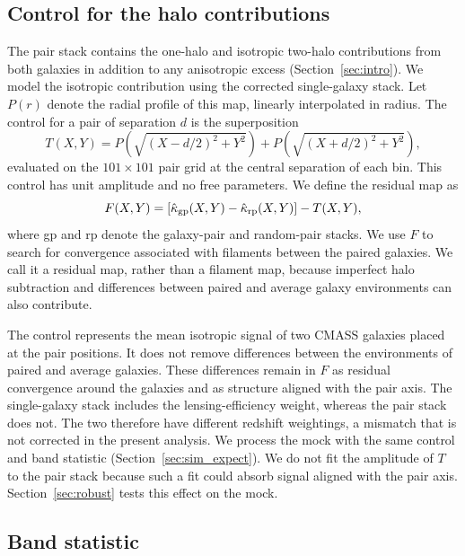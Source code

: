 \subsection{Control for the halo contributions}
\label{sec:control}

The pair stack contains the one-halo and isotropic two-halo contributions
from both galaxies in addition to any anisotropic excess
(Section~\ref{sec:intro}). We model the isotropic contribution using the
corrected single-galaxy stack. Let $P(r)$ denote the radial profile of this
map, linearly interpolated in radius. The control for a
pair of separation $d$ is the superposition
\begin{equation}
  T(X,Y) = P\!\left(\sqrt{(X-d/2)^{2}+Y^{2}}\right)
         + P\!\left(\sqrt{(X+d/2)^{2}+Y^{2}}\right),
  \label{eq:control}
\end{equation}
evaluated on the $101\times101$ pair grid at the central separation of each
bin. This control has unit amplitude and no free parameters. We define the
residual map as
\begin{equation}
  F(X,Y) = \left[\hat\kappa_{\rm gp}(X,Y)-\hat\kappa_{\rm rp}(X,Y)\right]
           - T(X,Y),
  \label{eq:filament}
\end{equation}
where gp and rp denote the galaxy-pair and random-pair stacks.
We use $F$ to search for convergence associated with filaments between the
paired galaxies. We call it a residual map, rather than a filament map,
because imperfect halo subtraction and differences between paired and average
galaxy environments can also contribute.

The control represents the mean isotropic signal of two CMASS galaxies placed
at the pair positions. It does not remove differences between the
environments of paired and average galaxies. These differences remain in
$F$ as residual convergence around the galaxies and as structure aligned
with the pair axis. The single-galaxy stack includes the lensing-efficiency
weight, whereas the pair stack does not. The two therefore have different
redshift weightings, a mismatch that is not corrected in the present
analysis. We process the mock with the same control and band statistic
(Section~\ref{sec:sim_expect}). We do not fit the amplitude of $T$ to the
pair stack because such a fit could absorb signal aligned with the pair axis.
Section~\ref{sec:robust} tests this effect on the mock.

\subsection{Band statistic}
\label{sec:bands}

